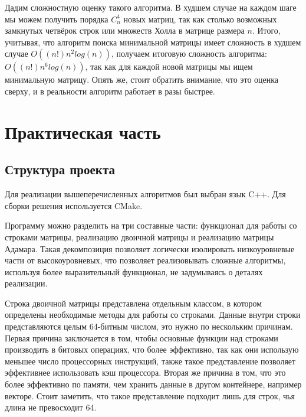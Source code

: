 \documentclass[a4paper, 14pt]{extreport}
\begin{document}
Дадим сложностную оценку такого алгоритма. В худшем случае на каждом шаге мы можем получить порядка $C_n^4$ новых матриц, так как столько возможных замкнутых четвёрок строк или множеств Холла в матрице размера $n$. Итого, учитывая, что алгоритм поиска минимальной матрицы имеет сложность в худшем случае $O((n!)n^2log(n))$, получаем итоговую сложность алгоритма: $O((n!)n^6log(n))$, так как для каждой новой матрицы мы ищем минимальную матрицу. Опять же, стоит обратить внимание, что это оценка сверху, и в реальности алгоритм работает в разы быстрее.

\section{Практическая часть}



\subsection{Структура проекта}

Для реализации вышеперечисленных алгоритмов был выбран язык C++. Для сборки решения используется CMake.

Программу можно разделить на три составные части: функционал для работы со строками матрицы, реализацию двоичной матрицы и реализацию матрицы Адамара. Такая декомпозиция позволяет логически изолировать низкоуровневые части от высокоуровневых, что позволяет реализовывать сложные алгоритмы, используя более выразительный функционал, не задумываясь о деталях реализации.

Строка двоичной матрицы представлена отдельным классом, в котором определены необходимые методы для работы со строками. Данные внутри строки представляются целым 64-битным числом, это нужно по нескольким причинам. Первая причина заключается в том, чтобы основные функции над строками производить в битовых операциях, что более эффективно, так как они использую меньшее число процессорных инструкций, также такое представление позволяет эффективнее использовать кэш процессора. Вторая же причина в том, что это более эффективно по памяти, чем хранить данные в другом контейнере, например векторе. Стоит заметить, что такое представление подходит лишь для строк, чья длина не превосходит 64.
\end{document}
